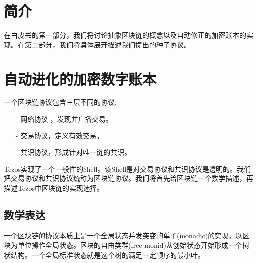 \documentclass[letterpaper]{article}
\begin{document}
\tableofcontents
\newpage

\section{简介}

在白皮书的第一部分，我们将讨论抽象区块链的概念以及自动修正的加密账本的实现。在第二部分，我们将具体展开描述我们提出的种子协议。

\section{自动进化的加密数字账本}

一个区块链协议包含三层不同的协议:
\begin{itemize}
\item[-] 网络协议 ，发现并广播交易。
\item[-] 交易协议，定义有效交易。
\item[-] 共识协议，形成针对唯一链的共识。
\end{itemize}


Tezos实现了一个一般性的Shell。该Shell是对交易协议和共识协议是透明的。我们把交易协议和共识协议统称为区块链协议。我们将首先给区块链一个数学描述，再描述Tezos中区块链的实现选择。

\subsection{数学表达}

一个区块链的协议本质上是一个全局状态并发突变的单子(monadic)的实现，以区块为单位操作全局状态。区块的自由类群(free monid)从创始状态开始形成一个树状结构。一个全局标准状态就是这个树的满足一定顺序的最小叶。
\end{document}
